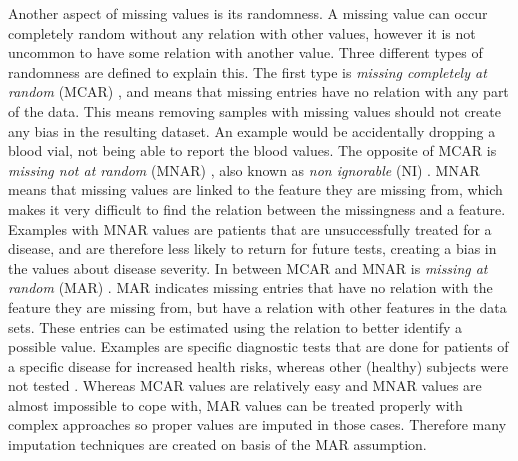 \documentclass[10pt,a4paper]{report}
\begin{document}
	Another aspect of missing values is its randomness. A missing value can occur completely random without any relation with other values, however it is not uncommon to have some relation with another value. Three different types of randomness are defined to explain this. The first type is \textit{missing completely at random} (MCAR) \cite{donders2006gentle,cartwright2003dealing, haukoos2007advanced}, and means that missing entries have no relation with any part of the data. This means removing samples with missing values should not create any bias in the resulting dataset. An example would be accidentally dropping a blood vial, not being able to report the blood values. The opposite of MCAR is \textit{missing not at random} (MNAR) \cite{donders2006gentle, haukoos2007advanced}, also known as \textit{non ignorable} (NI) \cite{cartwright2003dealing}. MNAR means that missing values are linked to the feature they are missing from, which makes it very difficult to find the relation between the missingness and a feature. Examples with MNAR values are patients that are unsuccessfully treated for a disease, and are therefore less likely to return for future tests, creating a bias in the values about disease severity. In between MCAR and MNAR is \textit{missing at random} (MAR) \cite{donders2006gentle,cartwright2003dealing, haukoos2007advanced}. MAR indicates missing entries that have no relation with the feature they are missing from, but have a relation with other features in the data sets. These entries can be estimated using the relation to better identify a possible value. Examples are specific diagnostic tests that are done for patients of a specific disease for increased health risks, whereas other (healthy) subjects were not tested \cite{haukoos2007advanced}. Whereas MCAR values are relatively easy and MNAR values are almost impossible to cope with, MAR values can be treated properly with complex approaches so proper values are imputed in those cases. Therefore many imputation techniques are created on basis of the MAR assumption.
	
\end{document}
